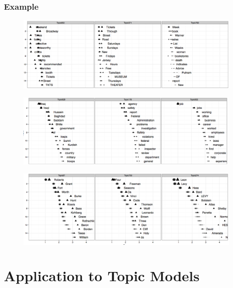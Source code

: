 \documentclass{beamer}
\begin{document}
\subsubsection{Example} 

\begin{frame}
\begin{figure}
    \centering
    \includegraphics[width = \linewidth]{"./plot/fig1_1"}
\end{figure}
\end{frame}

\begin{frame}
\begin{figure}
    \centering
    \includegraphics[width = \linewidth]{"./plot/fig1_2"}
\end{figure}
\end{frame}

\begin{frame}
\begin{figure}
    \centering
    \includegraphics[width = \linewidth]{"./plot/fig1_3"}
\end{figure}
\end{frame}

\section{Application to Topic Models} 
\end{document}
